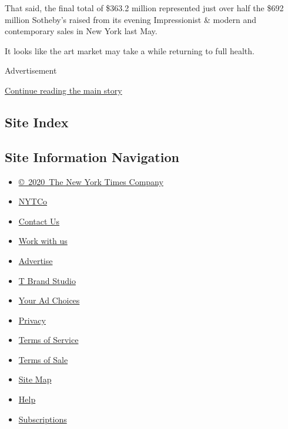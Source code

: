 That said, the final total of \$363.2 million represented just over half
the \$692 million Sotheby's raised from its evening Impressionist \&
modern and contemporary sales in New York last May.

It looks like the art market may take a while returning to full health.

Advertisement

\protect\hyperlink{after-bottom}{Continue reading the main story}

\hypertarget{site-index}{%
\subsection{Site Index}\label{site-index}}

\hypertarget{site-information-navigation}{%
\subsection{Site Information
Navigation}\label{site-information-navigation}}

\begin{itemize}
\tightlist
\item
  \href{https://help.nytimes3xbfgragh.onion/hc/en-us/articles/115014792127-Copyright-notice}{©~2020~The
  New York Times Company}
\end{itemize}

\begin{itemize}
\tightlist
\item
  \href{https://www.nytco.com/}{NYTCo}
\item
  \href{https://help.nytimes3xbfgragh.onion/hc/en-us/articles/115015385887-Contact-Us}{Contact
  Us}
\item
  \href{https://www.nytco.com/careers/}{Work with us}
\item
  \href{https://nytmediakit.com/}{Advertise}
\item
  \href{http://www.tbrandstudio.com/}{T Brand Studio}
\item
  \href{https://www.nytimes3xbfgragh.onion/privacy/cookie-policy\#how-do-i-manage-trackers}{Your
  Ad Choices}
\item
  \href{https://www.nytimes3xbfgragh.onion/privacy}{Privacy}
\item
  \href{https://help.nytimes3xbfgragh.onion/hc/en-us/articles/115014893428-Terms-of-service}{Terms
  of Service}
\item
  \href{https://help.nytimes3xbfgragh.onion/hc/en-us/articles/115014893968-Terms-of-sale}{Terms
  of Sale}
\item
  \href{https://spiderbites.nytimes3xbfgragh.onion}{Site Map}
\item
  \href{https://help.nytimes3xbfgragh.onion/hc/en-us}{Help}
\item
  \href{https://www.nytimes3xbfgragh.onion/subscription?campaignId=37WXW}{Subscriptions}
\end{itemize}
